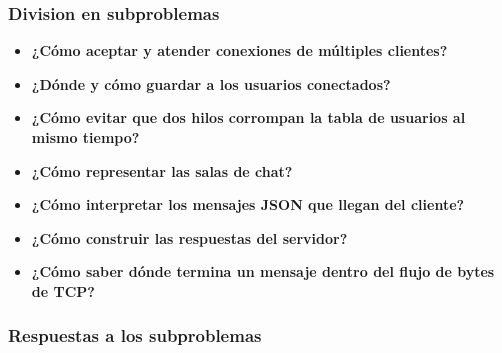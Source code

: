 \documentclass{article}
\begin{document}
\subsubsection{Division en subproblemas}

\begin{itemize}
    \item \textbf{¿Cómo aceptar y atender conexiones de múltiples clientes?}

    \item \textbf{¿Dónde y cómo guardar a los usuarios conectados?}

    \item \textbf{¿Cómo evitar que dos hilos corrompan la tabla de usuarios al mismo tiempo?}

    \item \textbf{¿Cómo representar las salas de chat?}

    \item \textbf{¿Cómo interpretar los mensajes JSON que llegan del cliente?}

    \item \textbf{¿Cómo construir las respuestas del servidor?}

    \item \textbf{¿Cómo saber dónde termina un mensaje dentro del flujo de bytes de TCP?}
\end{itemize}

\subsubsection{Respuestas a los subproblemas}
\end{document}
